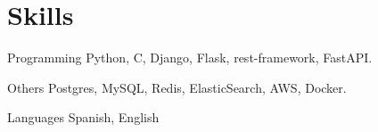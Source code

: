 
\section{Skills}

  \cvitem
    {Programming}
    {Python, C, Django, Flask, rest-framework, FastAPI.}

  \cvitem
    {Others}
    {Postgres, MySQL, Redis, ElasticSearch, AWS, Docker.}

  \cvitem
    {Languages}
    {Spanish, English}

